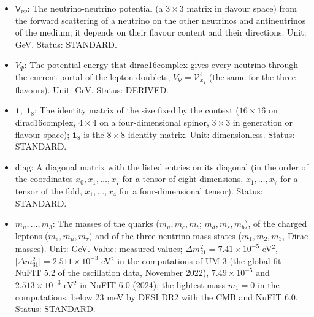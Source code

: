 \documentclass[
  10pt,
]{article}
\begin{document}
\begin{itemize}
  \(\mathsf{V}_{\mathrm{m}}\): The matter potential of the neutrinos (a
  \(3 \times 3\) matrix in flavour space) from their forward scattering
  on the electrons, positrons and neutrons of the medium. Unit: GeV.
  Status: STANDARD.
\item
  \(\mathsf{V}_{\nu\nu}\): The neutrino-neutrino potential (a
  \(3 \times 3\) matrix in flavour space) from the forward scattering of
  a neutrino on the other neutrinos and antineutrinos of the medium; it
  depends on their flavour content and their directions. Unit: GeV.
  Status: STANDARD.
\item
  \(V_\Psi\): The potential energy that dirac16complex gives every
  neutrino through the current portal of the lepton doublets,
  \(V_\Psi = \mathcal{V}^{\ell}_{x_4}\) (the same for the three
  flavours). Unit: GeV. Status: DERIVED.
\item
  \(\mathbf{1},\ \mathbf{1}_8\): The identity matrix of the size fixed
  by the context (\(16 \times 16\) on dirac16complex, \(4 \times 4\) on
  a four-dimensional spinor, \(3 \times 3\) in generation or flavour
  space); \(\mathbf{1}_8\) is the \(8 \times 8\) identity matrix. Unit:
  dimensionless. Status: STANDARD.
\item
  \(\mathrm{diag}\): A diagonal matrix with the listed entries on its
  diagonal (in the order of the coordinates \(x_0, x_1, \dots, x_7\) for
  a tensor of eight dimensions, \(x_1, \dots, x_7\) for a tensor of the
  fold, \(x_1, \dots, x_4\) for a four-dimensional tensor). Status:
  STANDARD.
\item
  \(m_u, \dots, m_3\): The masses of the quarks (\(m_u, m_c, m_t\);
  \(m_d, m_s, m_b\)), of the charged leptons (\(m_e, m_\mu, m_\tau\))
  and of the three neutrino mass states (\(m_1, m_2, m_3\), Dirac
  masses). Unit: GeV. Value: measured values;
  \(\Delta m_{21}^2 = 7.41\times10^{-5}\) eV\(^2\),
  \(\lvert\Delta m_{31}^2\rvert = 2.511\times10^{-3}\) eV\(^2\) in the
  computations of UM-3 (the global fit NuFIT 5.2 of the oscillation
  data, November 2022), \(7.49\times10^{-5}\) and \(2.513\times10^{-3}\)
  eV\(^2\) in NuFIT 6.0 (2024); the lightest mass \(m_1 = 0\) in the
  computations, below 23 meV by DESI DR2 with the CMB and NuFIT 6.0.
  Status: STANDARD.
\end{itemize}
\end{document}
